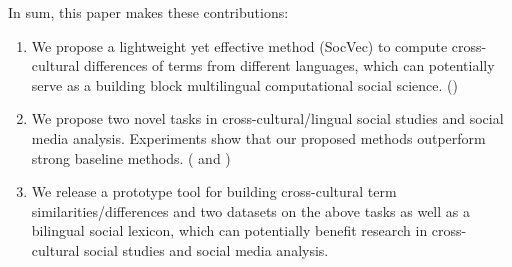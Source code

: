%
In sum, this paper makes these contributions: 
\begin{enumerate}
\item We propose a lightweight yet effective method (SocVec) to compute cross-cultural differences of terms from different languages, which can potentially serve as a building block multilingual computational social science. ()

\item We propose two novel tasks in cross-cultural/lingual social studies and social media analysis. Experiments
show that our proposed methods outperform strong baseline methods. ( and )

\item We release a prototype tool for building cross-cultural term similarities/differences and 
two datasets on the above tasks as well as 
a bilingual social lexicon, which can potentially benefit research in cross-cultural social studies and social media analysis.
\end{enumerate}
